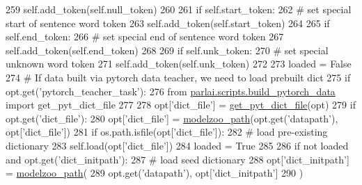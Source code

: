 \begin{DoxyCode}
259                 self.add\_token(self.null\_token)
260 
261             \textcolor{keywordflow}{if} self.start\_token:
262                 \textcolor{comment}{# set special start of sentence word token}
263                 self.add\_token(self.start\_token)
264 
265             \textcolor{keywordflow}{if} self.end\_token:
266                 \textcolor{comment}{# set special end of sentence word token}
267                 self.add\_token(self.end\_token)
268 
269             \textcolor{keywordflow}{if} self.unk\_token:
270                 \textcolor{comment}{# set special unknown word token}
271                 self.add\_token(self.unk\_token)
272 
273             loaded = \textcolor{keyword}{False}
274             \textcolor{comment}{# If data built via pytorch data teacher, we need to load prebuilt dict}
275             \textcolor{keywordflow}{if} opt.get(\textcolor{stringliteral}{'pytorch\_teacher\_task'}):
276                 \textcolor{keyword}{from} \hyperlink{namespaceparlai_1_1scripts_1_1build__pytorch__data}{parlai.scripts.build\_pytorch\_data} \textcolor{keyword}{import} 
      get\_pyt\_dict\_file
277 
278                 opt[\textcolor{stringliteral}{'dict\_file'}] = \hyperlink{namespaceparlai_1_1scripts_1_1build__pytorch__data_a6ec85a5842150af78f5178d75075b0cc}{get\_pyt\_dict\_file}(opt)
279             \textcolor{keywordflow}{if} opt.get(\textcolor{stringliteral}{'dict\_file'}):
280                 opt[\textcolor{stringliteral}{'dict\_file'}] = \hyperlink{namespaceparlai_1_1agents_1_1legacy__agents_1_1seq2seq_1_1utils__v0_a5fbd3301b67f00d6d146fb01c7cd7626}{modelzoo\_path}(opt.get(\textcolor{stringliteral}{'datapath'}), opt[\textcolor{stringliteral}{'dict\_file'}])
281                 \textcolor{keywordflow}{if} os.path.isfile(opt[\textcolor{stringliteral}{'dict\_file'}]):
282                     \textcolor{comment}{# load pre-existing dictionary}
283                     self.load(opt[\textcolor{stringliteral}{'dict\_file'}])
284                     loaded = \textcolor{keyword}{True}
285 
286             \textcolor{keywordflow}{if} \textcolor{keywordflow}{not} loaded \textcolor{keywordflow}{and} opt.get(\textcolor{stringliteral}{'dict\_initpath'}):
287                 \textcolor{comment}{# load seed dictionary}
288                 opt[\textcolor{stringliteral}{'dict\_initpath'}] = \hyperlink{namespaceparlai_1_1agents_1_1legacy__agents_1_1seq2seq_1_1utils__v0_a5fbd3301b67f00d6d146fb01c7cd7626}{modelzoo\_path}(
289                     opt.get(\textcolor{stringliteral}{'datapath'}), opt[\textcolor{stringliteral}{'dict\_initpath'}]
290                 )

\end{DoxyCode}
